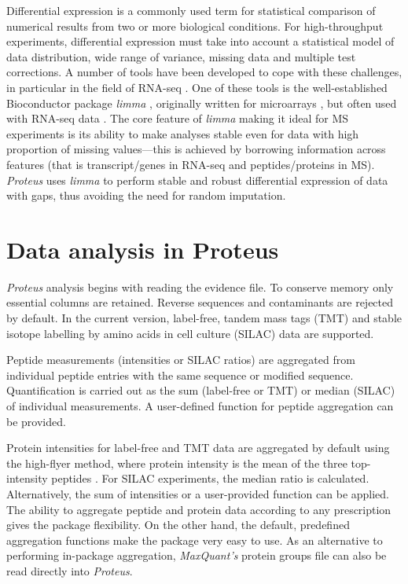 \documentclass[]{article}
\begin{document}
Differential expression is a commonly used term for statistical
comparison of numerical results from two or more biological conditions.
For high-throughput experiments, differential expression must take into
account a statistical model of data distribution, wide range of
variance, missing data and multiple test corrections. A number of tools
have been developed to cope with these challenges, in particular in the
field of RNA-seq \citep{gierlinski2015, schurch2016}. One of these tools
is the well-established Bioconductor package \emph{limma}
\citep{ritchie2015}, originally written for microarrays
\citep[e.g.][]{peart2005}, but often used with RNA-seq data \citep[see][
for comparison with other tools]{schurch2016}. The core feature of
\emph{limma} making it ideal for MS experiments is its ability to make
analyses stable even for data with high proportion of missing
values---this is achieved by borrowing information across features (that
is transcript/genes in RNA-seq and peptides/proteins in MS).
\emph{Proteus} uses \emph{limma} to perform stable and robust
differential expression of data with gaps, thus avoiding the need for
random imputation.

\section{Data analysis in Proteus}\label{data-analysis-in-proteus}

\emph{Proteus} analysis begins with reading the evidence file. To
conserve memory only essential columns are retained. Reverse sequences
and contaminants are rejected by default. In the current version,
label-free, tandem mass tags (TMT) \citep{thompson2003} and stable
isotope labelling by amino acids in cell culture (SILAC) \citep{ong2002}
data are supported.

Peptide measurements (intensities or SILAC ratios) are aggregated from
individual peptide entries with the same sequence or modified sequence.
Quantification is carried out as the sum (label-free or TMT) or median
(SILAC) of individual measurements. A user-defined function for peptide
aggregation can be provided.

Protein intensities for label-free and TMT data are aggregated by
default using the high-flyer method, where protein intensity is the mean
of the three top-intensity peptides \citep{silva2006}. For SILAC
experiments, the median ratio is calculated. Alternatively, the sum of
intensities or a user-provided function can be applied. The ability to
aggregate peptide and protein data according to any prescription gives
the package flexibility. On the other hand, the default, predefined
aggregation functions make the package very easy to use. As an
alternative to performing in-package aggregation, \emph{MaxQuant's}
protein groups file can also be read directly into \emph{Proteus}.
\end{document}
